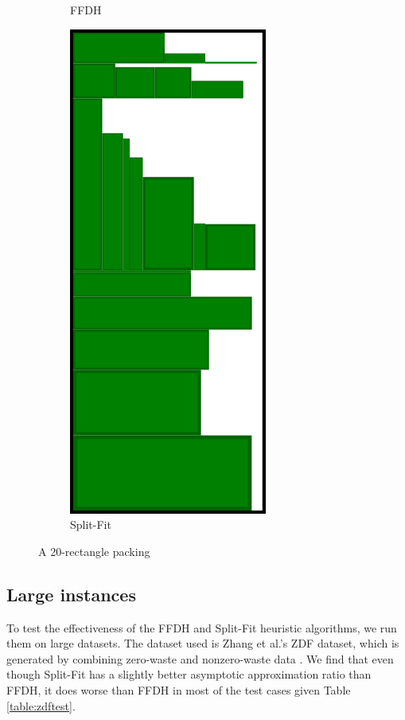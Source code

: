 \documentclass{article}
\begin{document}
\begin{figure}[!h]
\begin{subfigure}[b]{.35\textwidth}
  \caption{FFDH}
\end{subfigure}%
\begin{subfigure}[b]{.35\textwidth}
  \centering
  \includegraphics[width=.5\linewidth]{diagrams/SplitFit20Rects.png}
  \caption{Split-Fit}
\end{subfigure}
  \caption{A 20-rectangle packing}
\end{figure}

\subsection{Large instances}
To test the effectiveness of the FFDH and Split-Fit heuristic algorithms, we run them on large datasets. The dataset used is Zhang et al.'s ZDF dataset, which is generated by combining zero-waste and nonzero-waste data \cite{zdf}. We find that even though Split-Fit has a slightly better asymptotic approximation ratio than FFDH, it does worse than FFDH in most of the test cases given Table \ref{table:zdftest}.
\end{document}
